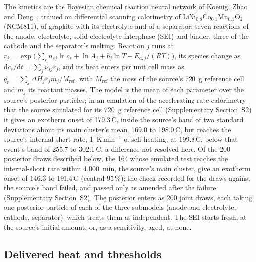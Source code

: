 \documentclass[preprint,12pt]{elsarticle}
\newcommand{\degC}{\,\textdegree C}
\begin{document}
The kinetics are the Bayesian chemical reaction neural network of Koenig, Zhao and Deng~\cite{koenig2025uncertainty}, trained on differential scanning calorimetry of LiNi$_{0.8}$Co$_{0.1}$Mn$_{0.1}$O$_2$ (NCM811), of graphite with its electrolyte and of a separator: seven reactions of the anode, electrolyte, solid electrolyte interphase (SEI) and binder, three of the cathode and the separator's melting. Reaction $j$ runs at $r_j=\exp\!\big(\sum_s n_{sj}\ln c_s+\ln A_j+b_j\ln T-E_{a,j}/(RT)\big)$, its species change as $\mathrm{d}c_s/\mathrm{d}t=\sum_j\nu_{sj}r_j$, and its heat enters per unit cell mass as $\dot q_r=\sum_j\Delta H_j r_j m_j/M_\mathrm{ref}$, with $M_\mathrm{ref}$ the mass of the source's 720~g reference cell and $m_j$ its reactant masses. The model is the mean of each parameter over the source's posterior particles; in an emulation of the accelerating-rate calorimetry that the source simulated for its 720~g reference cell (Supplementary Section~S2) it gives an exotherm onset of 179.3\degC, inside the source's band of two standard deviations about its main cluster's mean, 169.0 to 198.0\degC, but reaches the source's internal-short rate, 1~K\,min$^{-1}$ of self-heating, at 199.8\degC, below that event's band of 255.7 to 302.1\degC, a difference not resolved here. Of the 200 posterior draws described below, the 164 whose emulated test reaches the internal-short rate within 4,000~min, the source's main cluster, give an exotherm onset of 146.3 to 191.4\degC{} (central 95\,\%); the check recorded for the draws against the source's band failed, and passed only as amended after the failure (Supplementary Section~S2). The posterior enters as 200 joint draws, each taking one posterior particle of each of the three submodels (anode and electrolyte, cathode, separator), which treats them as independent. The SEI starts fresh, at the source's initial amount, or, as a sensitivity, aged, at none.

\subsection{Delivered heat and thresholds}
\label{sec:delivery}
\end{document}
